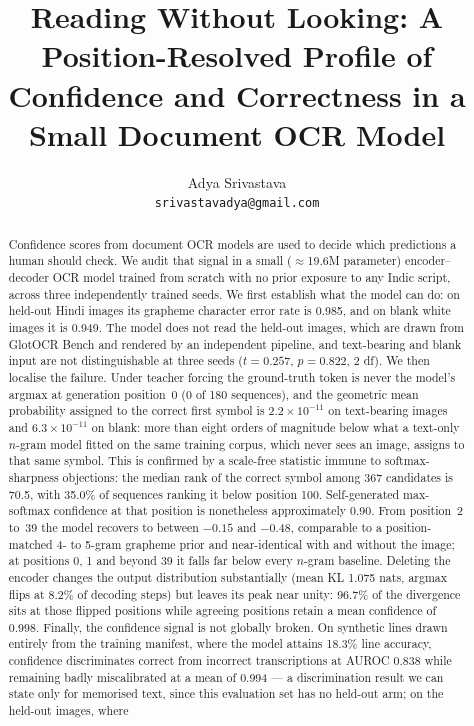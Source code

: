 \documentclass{article}
\title{Reading Without Looking: A Position-Resolved Profile of\\Confidence and Correctness in a Small Document OCR Model}
\author{%
  Adya Srivastava\\
  \texttt{srivastavadya@gmail.com}\\
}
\begin{document}
\maketitle

\begin{abstract}
Confidence scores from document OCR models are used to decide which predictions a human
should check. We audit that signal in a small ($\approx$19.6M parameter) encoder--decoder OCR
model trained from scratch with no prior exposure to any Indic script, across three
independently trained seeds. We first establish what the model can do: on held-out Hindi
images its grapheme character error rate is 0.985, and on blank white images it is 0.949. The
model does not read the held-out images, which are drawn from GlotOCR Bench and rendered by an
independent pipeline, and text-bearing and blank input are not distinguishable at three seeds
($t = 0.257$, $p = 0.822$, 2 df). We then localise the
failure. Under teacher forcing the ground-truth token is never the model's argmax at
generation position~0 (0 of 180 sequences), and the geometric mean probability assigned to the
correct first symbol is $2.2\times10^{-11}$ on text-bearing images and $6.3\times10^{-11}$ on blank:
more than eight orders of magnitude below what a text-only $n$-gram model fitted on the same
training corpus, which never sees an image, assigns to that same symbol. This is confirmed by a
scale-free statistic immune to softmax-sharpness objections: the median rank of the correct
symbol among 367 candidates is 70.5, with 35.0\% of sequences ranking it below position 100.
Self-generated max-softmax confidence at that position is nonetheless approximately 0.90. From position~2
to~39 the model recovers to between $-0.15$ and $-0.48$, comparable to a position-matched 4- to
5-gram grapheme prior and near-identical with and without the image; at positions 0, 1 and
beyond 39 it falls far below every $n$-gram baseline. Deleting the encoder changes the
output distribution substantially (mean KL 1.075 nats, argmax flips at 8.2\% of decoding
steps) but leaves its peak near unity: 96.7\% of the divergence sits at those flipped
positions while agreeing positions retain a mean confidence of 0.998. Finally, the confidence signal is not globally broken. On
synthetic lines drawn entirely from the training manifest, where the model attains 18.3\% line
accuracy, confidence discriminates correct from incorrect transcriptions at AUROC 0.838 while
remaining badly miscalibrated at a mean of 0.994 --- a discrimination result we can state only
for memorised text, since this evaluation set has no held-out arm; on the held-out images, where

\end{abstract}
\end{document}
